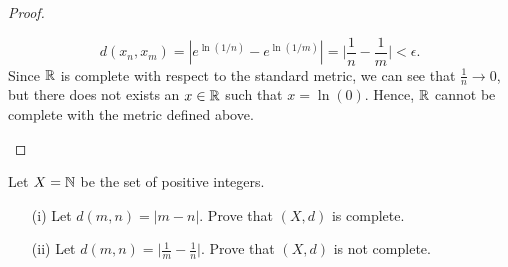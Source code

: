 \documentclass[a4paper]{article}
\begin{document}
\begin{proof}
\begin{enumerate}
            \[  d({x}_{n}, {x}_{m}) = | e^{\ln(1/n)} - e^{\ln(1/m)}  | = \Big| \frac{ 1 }{ n }  - \frac{ 1 }{ m }  \Big| < \epsilon.   \]
            Since \( \mathbb{R}  \) is complete with respect to the standard metric, we can see that \( \frac{ 1 }{ n } \to 0  \), but there does not exists an \( x \in \mathbb{R}  \) such that \( x = \ln(0) \). Hence, \( \mathbb{R}  \) cannot be complete with the metric defined above.
    \end{enumerate}
\end{proof}

\begin{problem}
    Let \( X = \mathbb{N} \) be the set of positive integers.
\begin{enumerate}
    \item[(i)] Let \( d(m,n) = | m - n |  \). Prove that \( (X,d) \) is complete.
    \item[(ii)] Let \( d(m,n) = \Big| \frac{ 1 }{ m }  - \frac{ 1 }{ n }  \Big|  \). Prove that \( (X,d) \) is not complete.
\end{enumerate}
\end{problem}
\end{document}
